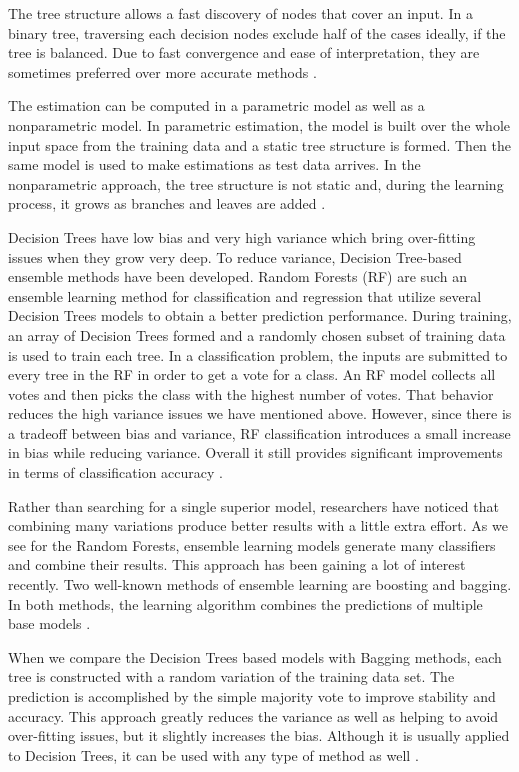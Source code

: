 \documentclass[journal]{IEEEtran}
\begin{document}
The tree structure allows a fast discovery of nodes that cover an input. In a binary tree,
traversing each decision nodes exclude half of the cases ideally, if the tree is balanced. Due to fast convergence and ease of interpretation, they are sometimes preferred over more accurate methods \cite{alpaydin2014introduction}.

The estimation can be computed in a parametric model as well as a nonparametric model. In
parametric estimation, the model is built over the whole input space from the training data and a static tree structure is formed. Then the same model is used to make estimations as test data arrives. In the nonparametric approach, the tree structure is not static and, during the learning process, it grows as branches and leaves are added \cite{alpaydin2014introduction}.

Decision Trees have low bias and very high variance which bring over-fitting issues when they grow very deep. To reduce variance, Decision Tree-based ensemble methods have been developed. Random Forests (RF) are such an ensemble learning method for classification and regression that utilize several Decision Trees models to obtain a better prediction performance. During training, an array of Decision Trees formed and a randomly chosen subset of training data is used to train each tree. In a classification problem, the inputs are submitted to every tree in the RF in order to get a vote for a class. An RF model collects all votes and then picks the class with the highest number of votes. That behavior reduces the high variance issues we have mentioned above. However, since there is a tradeoff between bias and variance, RF classification introduces a small increase in bias while reducing variance. Overall it still provides significant improvements in terms of classification accuracy \cite{mushtaq2012empirical} \cite{breiman2001random}.

Rather than searching for a single superior model, researchers have noticed that combining many variations produce better results with a little extra effort. As we see for the Random Forests, ensemble learning models generate many classifiers and combine their results. This approach has been gaining a lot of interest recently. Two well-known methods of ensemble learning are boosting and bagging. In both methods, the learning algorithm combines the predictions of multiple base models \cite{domingos2012few} \cite{liaw2002classification} \cite{oza2005online}.

When we compare the Decision Trees based models with Bagging methods, each tree is constructed with a random variation of the training data set. The prediction is accomplished by the simple majority vote to improve stability and accuracy. This approach greatly reduces the variance as well as helping to avoid over-fitting issues, but it slightly increases the bias. Although it is usually applied to Decision Trees, it can be used with any type of method as well \cite{domingos2012few} \cite{liaw2002classification}.
\end{document}
